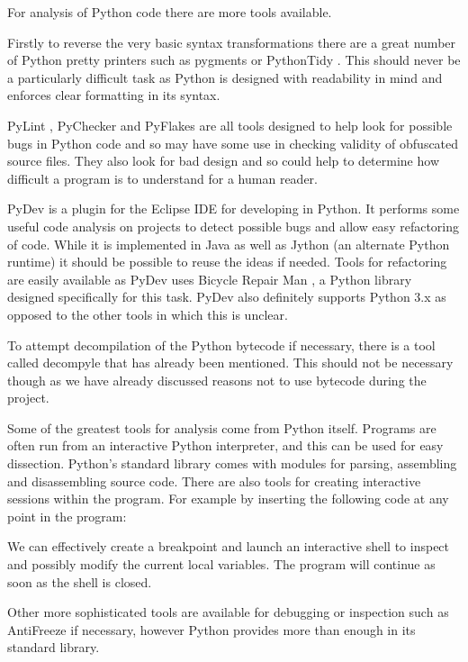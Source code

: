 \documentclass[twoside,a4paper]{report}
\begin{document}
For analysis of Python code there are more tools available.

Firstly to reverse the very basic syntax transformations there are a great number of Python pretty printers such as
pygments \cite{pygments} or PythonTidy \cite{pythontidy}. This should never be a particularly difficult task as Python is
designed with readability in mind and enforces clear formatting in its syntax.

PyLint \cite{pylint}, PyChecker \cite{pychecker} and PyFlakes \cite{pyflakes} are all tools designed to help look for possible
bugs in Python code and so may have some use in checking validity of obfuscated source files. They also look for bad design and so
could help to determine how difficult a program is to understand for a human reader.

PyDev \cite{pydev} is a plugin for the Eclipse IDE for developing in Python. It performs some useful code analysis on projects to detect
possible bugs and allow easy refactoring of code. While it is implemented in Java as well as Jython (an alternate Python runtime)
it should be possible to reuse the ideas if needed. Tools for refactoring are easily available as PyDev uses Bicycle Repair
Man \cite{bikerepair}, a Python library designed specifically for this task. PyDev also definitely supports Python 3.x as opposed to the
other tools in which this is unclear.

To attempt decompilation of the Python bytecode if necessary, there is a tool called decompyle \cite{decompyle} that has already been
mentioned. This should not be necessary though as we have already discussed reasons not to use bytecode during the project.

Some of the greatest  tools for analysis come from Python itself. Programs are often run from an interactive Python interpreter, and this
can be used for easy dissection. Python's standard library comes with modules for parsing, assembling and disassembling source code.
There are also tools for creating interactive sessions within the program. For example by inserting the following code at any point
in the program:



We can effectively create a breakpoint and launch an interactive shell to inspect and possibly modify the current local
variables. The program will continue as soon as the shell is closed.

Other more sophisticated tools are available for debugging or inspection such as AntiFreeze \cite{pirates} if necessary,
however Python provides more than enough in its standard library.
\end{document}
